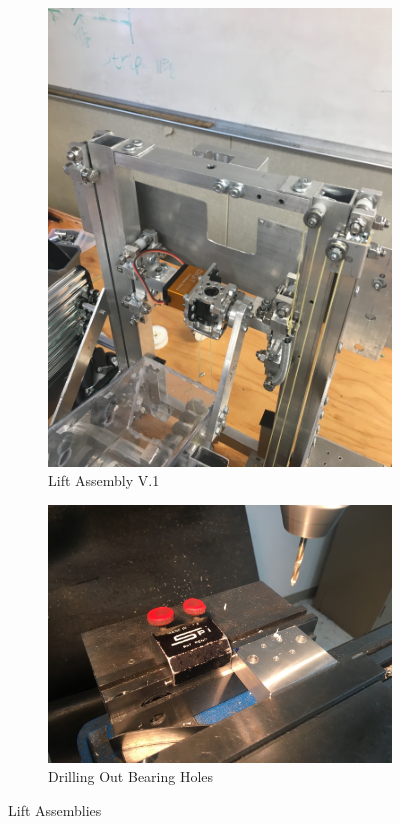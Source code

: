 \documentclass{article}
\begin{document}
\begin{figure}[h!]
\begin{subfigure}{.45\textwidth}
  \includegraphics[width=\textwidth,angle=-90]{27_03-04/images/Lift1.JPG}
  \caption{Lift Assembly V.1}
  \label{fig:lift1}
  \end{subfigure}
  \begin{subfigure}{.45\textwidth}
    \centering
    \includegraphics[width=\textwidth]{27_03-04/images/Drill.JPG}
    \caption{Drilling Out Bearing Holes}
    \label{fig:DrillHoles}
  \end{subfigure}
  \caption{Lift Assemblies}
  \end{figure}
\end{document}
